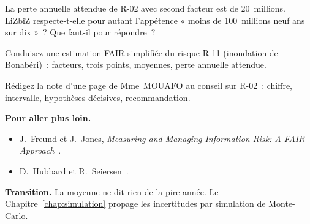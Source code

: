 \begin{boxexo}[title={\ding{45}\quad Exercice~9.8. Moyenne et pire année \niveaumoyen}]
La perte annuelle attendue de R-02 avec second facteur est de 20~millions.
LiZbiZ respecte-t-elle pour autant l'appétence « moins de 100~millions
neuf ans sur dix »~? Que faut-il pour répondre~?
\end{boxexo}

\begin{boxexo}[title={\ding{45}\quad Exercice~9.9. L'inondation \niveauexpert}]
Conduisez une estimation FAIR simplifiée du risque R-11 (inondation de
Bonabéri)~: facteurs, trois points, moyennes, perte annuelle attendue.
\end{boxexo}

\begin{boxexo}[title={\ding{45}\quad Exercice~9.10. La note au conseil \niveauexpert}]
Rédigez la note d'une page de Mme~MOUAFO au conseil sur R-02~: chiffre,
intervalle, hypothèses décisives, recommandation.
\end{boxexo}

\bigskip

\begin{boxinfo}
\textbf{Pour aller plus loin.}
\begin{itemize}
    \item J.~Freund et J.~Jones, \emph{Measuring and Managing Information
          Risk: A FAIR Approach}~\cite{freund2014fair}.
    \item D.~Hubbard et R.~Seiersen~\cite{hubbard2016cyber}.
\end{itemize}
\end{boxinfo}

\begin{boxinfo}
\textbf{Transition.} La moyenne ne dit rien de la pire année. Le
Chapitre~\ref{chap:simulation} propage les incertitudes par simulation de
Monte-Carlo.
\end{boxinfo}
